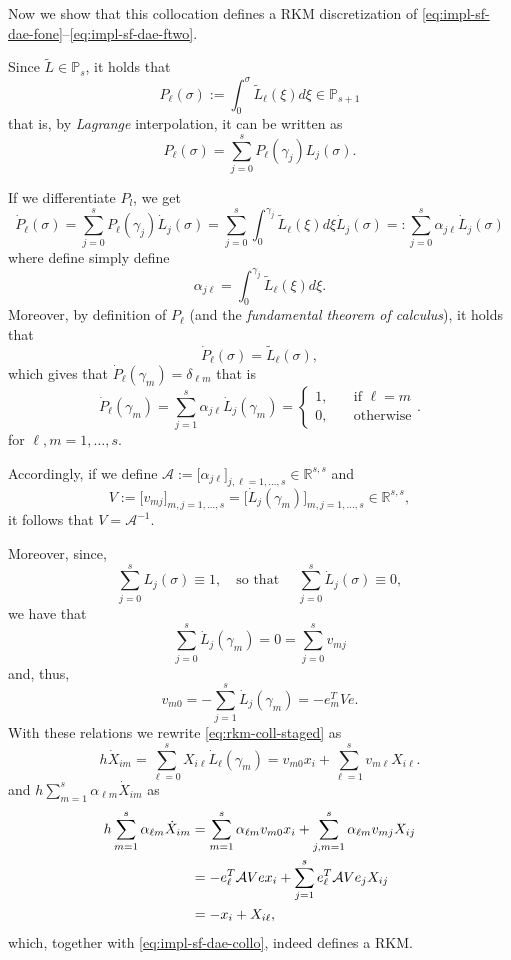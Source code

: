 \documentclass[]{book}
\theoremstyle{definition}
\theoremstyle{definition}
\theoremstyle{definition}
\theoremstyle{definition}
\theoremstyle{remark}
\begin{document}
Now we show that this collocation defines a RKM discretization of \eqref{eq:impl-sf-dae-fone}--\eqref{eq:impl-sf-dae-ftwo}.

Since \(\tilde L \in \mathbb P_s\), it holds that
\[
P_\ell(\sigma):=\int_0^\sigma \tilde L_\ell (\xi)d\xi \in \mathbb P_{s+1}
\]
that is, by \emph{Lagrange} interpolation, it can be written as
\[
P_\ell(\sigma) = \sum_{j=0}^s P_\ell(\gamma_j)L_j(\sigma).
\]

If we differentiate \(P_l\), we get
\[
\dot P_\ell(\sigma) = \sum_{j=0}^s P_\ell(\gamma_j)\dot L_j(\sigma) = \sum_{j=0}^s \int_0^{\gamma_j} \tilde L_\ell (\xi)d\xi \dot L_j(\sigma)=: \sum_{j=0}^s \alpha_{j\ell} \dot L_j(\sigma)
\]
where define simply define
\[
\alpha_{j\ell} = \int_0^{\gamma_j} \tilde L_\ell (\xi)d\xi.
\]
Moreover, by definition of \(P_\ell\) (and the \emph{fundamental theorem of calculus}), it holds that
\[
\dot P_\ell(\sigma) = \tilde L_\ell(\sigma),
\]
which gives that \(\dot P_\ell(\gamma_m) = \delta_{\ell m}\) that is
\[
\dot P_\ell(\gamma_m) = \sum_{j=1}^s\alpha_{j\ell}\dot L_j(\gamma_m) = 
\begin{cases}
1, &\quad \text{if }\ell =m \\
0, &\quad \text{otherwise} 
\end{cases}.
\]
for \(\ell, m=1,\dotsc,s\).

Accordingly, if we define \(\mathcal A := \bigl[\alpha_{j\ell}\bigr]_{j,\ell=1,\dotsc,s} \in \mathbb R^{s,s}\) and
\[
V:=\bigl[v_{mj}\bigr]_{m,j=1,\dotsc,s} = \bigl[ \dot L_j(\gamma_m) \bigr]_{m,j=1,\dotsc,s} \in \mathbb R^{s,s} ,
\]
it follows that \(V=\mathcal A^{-1}\).

Moreover, since,
\[
\sum_{j=0}^s L_j(\sigma) \equiv 1, \quad\text{so that }\quad\sum_{j=0}^s \dot L_j(\sigma) \equiv 0,
\]
we have that
\[
\sum_{j=0}^s \dot L_j(\gamma_m) =0= \sum_{j=0}^s v_{mj}
\]
and, thus,
\[
v_{m0} = -\sum_{j=1}^s \dot L_j(\gamma_m) = -e_m^TVe.
\]
With these relations we rewrite \eqref{eq:rkm-coll-staged} as
\[
h\dot X_{im} = \sum_{\ell=0}^sX_{i\ell}\dot L_\ell(\gamma_m) = v_{m0}x_i + \sum_{\ell=1}^sv_{m\ell}X_{i\ell}.
\]
and \(h\sum_{m=1}^s\alpha_{\ell m} \dot X_{im}\) as
\begin{align}
  h\sum_{m=1}^s \alpha_{\ell m}\dot X_{im} &= \sum_{m=1}^s \alpha_{\ell m}v_{m0}x_i + \sum_{j,m=1}^s \alpha_{\ell m}v_{mj}X_{ij} \notag \\
  &= -e_\ell^T \mathcal AV e x_i + \sum_{j=1}^se_\ell^T \mathcal AVe_jX_{ij} \label{eq:collo-is-RKM-formula}\\
  &= -x_i + X_{i\ell}, \notag
\end{align}
which, together with \eqref{eq:impl-sf-dae-collo}, indeed defines a RKM.
\end{document}
